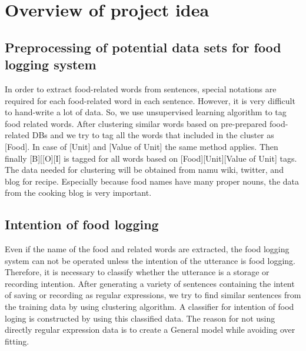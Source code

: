 \documentclass[11pt,a4paper]{article}
\begin{document}
\section{Overview of project idea}

\subsection{Preprocessing of potential data sets for food logging system}
In order to extract food-related words from sentences, special notations are required for each food-related word in each sentence. However, it is very difficult to hand-write a lot of data. So, we use unsupervised learning algorithm to tag food related words. After clustering similar words based on pre-prepared food-related DBs and we try to tag all the words that included in the cluster as [Food]. In case of [Unit] and [Value of Unit] the same method applies. Then finally [B][[O][I] is tagged for all words based on [Food][Unit][Value of Unit] tags. The data needed for clustering will be obtained from namu wiki, twitter, and blog for recipe. Especially because food names have many proper nouns, the data from the cooking blog is very important.


\subsection{Intention of food logging}
Even if the name of the food and related words are extracted, the food logging system can not be operated unless the intention of the utterance is food logging. Therefore, it is necessary to classify whether the utterance is a storage or recording intention. After generating a variety of sentences containing the intent of saving or recording as regular expressions, we try to find similar sentences from the training data by using clustering algorithm. A classifier for intention of food loging is constructed by using this classified data. The reason for not using directly regular expression data is to create a General model while avoiding over fitting.
\end{document}
